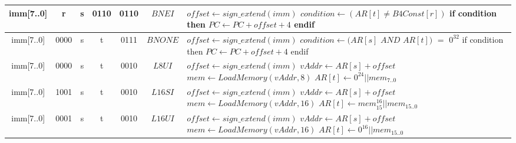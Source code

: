 \begin{longtable}{llllllllllllllllllllllll  p{1cm}  p{7cm} | }
       \multicolumn{8}{|c|}{imm[7..0]} & \multicolumn{4}{c|}{r} & \multicolumn{4}{c|}{s} & \multicolumn{4}{c|}{0110} & \multicolumn{4}{c|}{0110} & \multicolumn{1}{c|}{$BNEI$} & $offset \leftarrow sign\_extend(imm)$ \newline $condition \leftarrow (AR[t] \neq B4Const[r])$ \newline if condition then \newline $PC \leftarrow PC + offset + 4$ \newline endif\\ \hline
       \multicolumn{8}{|c|}{imm[7..0]} & \multicolumn{4}{c|}{0000} & \multicolumn{4}{c|}{s} & \multicolumn{4}{c|}{t} & \multicolumn{4}{c|}{0111} & \multicolumn{1}{c|}{$BNONE$} & $offset \leftarrow sign\_extend(imm)$ \newline $condition \leftarrow (AR[s]$ $AND$ $AR[t])$ $=$ $0^{32}$ \newline if condition then \newline $PC \leftarrow PC + offset + 4$ \newline endif\\ \hline
	   \multicolumn{8}{|c|}{imm[7..0]} & \multicolumn{4}{c|}{0000} & \multicolumn{4}{c|}{s} & \multicolumn{4}{c|}{t} & \multicolumn{4}{c|}{0010} & \multicolumn{1}{c|}{$L8UI$} & $offset \leftarrow sign\_extend(imm)$ \newline $vAddr \leftarrow AR[s] + offset$ \newline $mem \leftarrow LoadMemory(vAddr, 8)$ \newline $AR[t] \leftarrow 0^{24}||mem_{7..0}$\\ \hline
	   \multicolumn{8}{|c|}{imm[7..0]} & \multicolumn{4}{c|}{1001} & \multicolumn{4}{c|}{s} & \multicolumn{4}{c|}{t} & \multicolumn{4}{c|}{0010} & \multicolumn{1}{c|}{$L16SI$} & $offset \leftarrow sign\_extend(imm)$ \newline $vAddr \leftarrow AR[s] + offset$ \newline $mem \leftarrow LoadMemory(vAddr, 16)$ \newline $AR[t] \leftarrow mem_{15}^{16}||mem_{15..0}$\\ \hline
	   \multicolumn{8}{|c|}{imm[7..0]} & \multicolumn{4}{c|}{0001} & \multicolumn{4}{c|}{s} & \multicolumn{4}{c|}{t} & \multicolumn{4}{c|}{0010} & \multicolumn{1}{c|}{$L16UI$} & $offset \leftarrow sign\_extend(imm)$ \newline $vAddr \leftarrow AR[s] + offset$ \newline $mem \leftarrow LoadMemory(vAddr, 16)$ \newline $AR[t] \leftarrow 0^{16}||mem_{15..0}$\\ \hline

\end{longtable}
